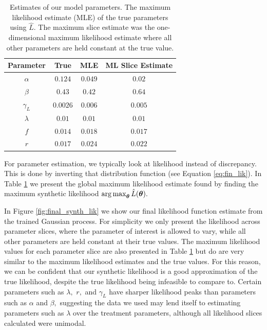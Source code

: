 \begin{table}[htbp]
    \caption[{
        Global and univariate maximum likelihood estimates for all model 
        parameters
    }]{
        Estimates of our model parameters.
        The maximum likelihood estimate (MLE) of the true parameters using
        $\hat{L}.$ The maximum slice estimate was the one-dimensional
        maximum likelihood estimate where all other parameters are held
        constant at the true value.
    }
    \label{tab:param_est}
    \centering
    \begin{tabular}{c | c | c | c}
        Parameter  & True     & MLE     & ML Slice Estimate \\
        \hline
        $\alpha$   & $0.124$  & $0.049$ & $0.02$            \\
        $\beta $   & $0.43$   & $0.42$  & $0.64$            \\
        $\gamma_L$ & $0.0026$ & $0.006$ & $0.005$           \\
        $\lambda$  & $0.01$   & $0.01$  & $0.01$            \\
        $f$        & $0.014$  & $0.018$ & $0.017$           \\
        $r$        & $0.017$  & $0.024$ & $0.022$           \\
    \end{tabular}
\end{table}

For parameter estimation, we typically look at likelihood instead of 
discrepancy. This is done by inverting 
that distribution function (see Equation \ref{eq:fin_lik}). 
In Table \ref{tab:param_est} we present the global maximum 
likelihood estimate found by finding the maximum synthetic likelihood 
$\operatorname*{arg\,max}_{\bm{\theta}}\hat{L}(\bm{\theta}).$

In Figure \ref{fig:final_synth_lik} we show our final likelihood function 
estimate from the trained Gaussian process.
For simplicity we only present the likelihood across parameter slices, where 
the parameter of 
interest is allowed to vary, while all other parameters are held constant at
their true values. The maximum likelihood values for each parameter slice
are also presented in Table \ref{tab:param_est} but do are very similar to the
maximum likelihood estimates and the true values. For this reason, 
we can be confident that our synthetic likelihood is a good approximation of
the true likelihood, despite the true likelihood being infeasible to compare
to. Certain parameters such as $\lambda,$ $r,$ and $\gamma_L$ have sharper 
likelihood peaks than parameters such as $\alpha$ and $\beta,$ suggesting the
data we used may lend itself to estimating parameters such as $\lambda$ over
the treatment parameters, although all likelihood slices calculated were
unimodal.


